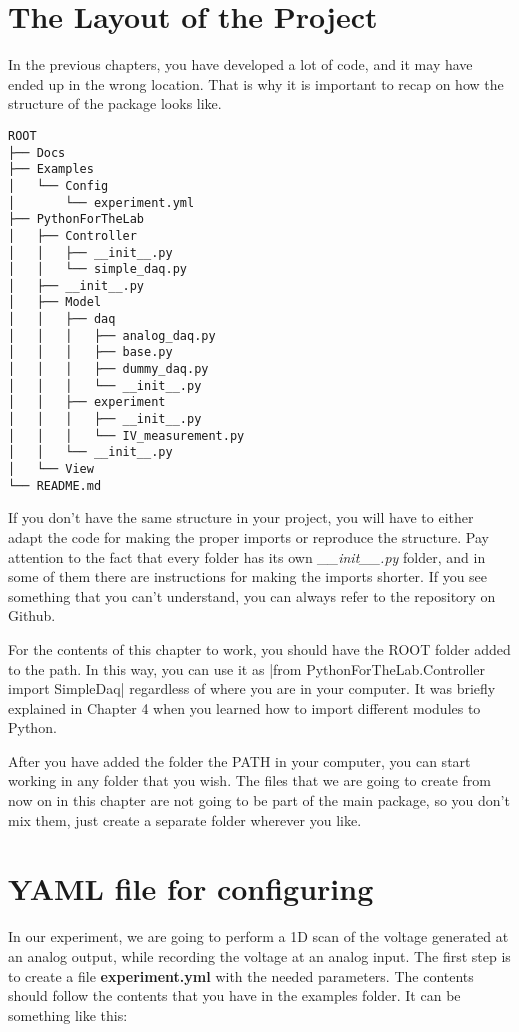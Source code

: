 \section{The Layout of the Project}\label{the-layout-of-theproject}
In the previous chapters, you have developed a lot of code, and it may
have ended up in the wrong location. That is why it is important to
recap on how the structure of the package looks like.

\begin{verbatim}
ROOT
├── Docs
├── Examples
│   └── Config
│       └── experiment.yml
├── PythonForTheLab
│   ├── Controller
│   │   ├── __init__.py
│   │   └── simple_daq.py
│   ├── __init__.py
│   ├── Model
│   │   ├── daq
│   │   │   ├── analog_daq.py
│   │   │   ├── base.py
│   │   │   ├── dummy_daq.py
│   │   │   └── __init__.py
│   │   ├── experiment
│   │   │   ├── __init__.py
│   │   │   └── IV_measurement.py
│   │   └── __init__.py
│   └── View
└── README.md
\end{verbatim}

If you don't have the same structure in your project, you will have to
either adapt the code for making the proper imports or reproduce the
structure. Pay attention to the fact that every folder has its own
\emph{\_\_init\_\_.py} folder, and in some of them there are
instructions for making the imports shorter. If you see something that
you can't understand, you can always refer to the repository on Github.

For the contents of this chapter to work, you should have the {ROOT}
folder added to the path. In this way, you can use it as
|from PythonForTheLab.Controller import SimpleDaq| 
regardless of where you are in your computer. It was briefly explained in Chapter 4
when you learned how to import different modules to Python.

After you have added the folder the {PATH} in your computer, you can
start working in any folder that you wish. The files that we are going
to create from now on in this chapter are not going to be part of the main package, so you don't mix them, just create a separate folder
wherever you like.

\section{{YAML} file for configuring}\label{yaml-file-forconfiguring}
In our experiment, we are going to perform a 1D scan of the voltage
generated at an analog output, while recording the voltage at an analog
input. The first step is to create a file \textbf{experiment.yml} with
the needed parameters. The contents should follow the contents that you
have in the examples folder. It can be something like this:

